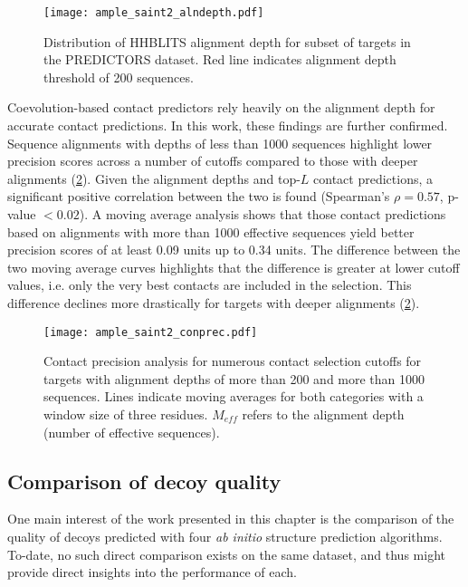 \begin{figure}[H]
    \centering
    \texttt{[image: ample\_saint2\_alndepth.pdf]}
    \caption[Distribution of alignment depth for subset of targets in the PREDICTORS dataset.]{Distribution of HHBLITS alignment depth for subset of targets in the PREDICTORS dataset. Red line indicates alignment depth threshold of 200 sequences.}
    \label{fig:ample_saint2_alndepth}
\end{figure}

Coevolution-based contact predictors rely heavily on the alignment depth for accurate contact predictions. In this work, these findings are further confirmed. Sequence alignments with depths of less than 1000 sequences highlight lower precision scores across a number of cutoffs compared to those with deeper alignments (\cref{fig:ample_saint2_conprec}). Given the alignment depths and top-$L$ contact predictions, a significant positive correlation between the two is found (Spearman's $\rho=0.57$, p-value $<0.02$). A moving average analysis shows that those contact predictions based on alignments with more than 1000 effective sequences yield better precision scores of at least 0.09 units up to 0.34 units. The difference between the two moving average curves highlights that the difference is greater at lower cutoff values, i.e. only the very best contacts are included in the selection. This difference declines more drastically for targets with deeper alignments (\cref{fig:ample_saint2_conprec}).

\begin{figure}[H]
    \centering
    \texttt{[image: ample\_saint2\_conprec.pdf]}
    \caption[Contact predicion analysis for numerous contact selection cutoffs]{Contact precision analysis for numerous contact selection cutoffs for targets with alignment depths of more than 200 and more than 1000 sequences. Lines indicate moving averages for both categories with a window size of three residues. $M_{eff}$ refers to the alignment depth (number of effective sequences).}
    \label{fig:ample_saint2_conprec}
\end{figure}

\subsection{Comparison of decoy quality}
One main interest of the work presented in this chapter is the comparison of the quality of decoys predicted with four \textit{ab initio} structure prediction algorithms. To-date, no such direct comparison exists on the same dataset, and thus might provide direct insights into the performance of each.

